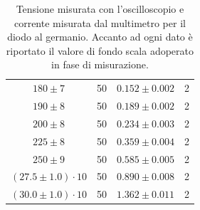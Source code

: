 \documentclass[a4paper,11pt]{article}
\begin{document}
\begin{table}[h!]
\begin{center}
\begin{tabular}{c|c|c|c}
      $180 \pm 7$               & 50                       & $0.152 \pm 0.002$      & 2                    \\
      $190 \pm 8$               & 50                       & $0.189 \pm 0.002$      & 2                    \\
      $200 \pm 8$               & 50                       & $0.234 \pm 0.003$      & 2                    \\
      $225 \pm 8$               & 50                       & $0.359 \pm 0.004$      & 2                    \\
      $250 \pm 9$               & 50                       & $0.585 \pm 0.005$      & 2                    \\
      $(27.5 \pm 1.0) \cdot 10$ & 50                       & $0.890 \pm 0.008$      & 2                    \\
      $(30.0 \pm 1.0) \cdot 10$ & 50                       & $1.362 \pm 0.011$      & 2                    \\
    \end{tabular}
    \caption{Tensione misurata con l'oscilloscopio e corrente misurata dal multimetro per il diodo al germanio. Accanto ad ogni dato è riportato il valore di fondo scala adoperato in fase di misurazione.}
  \end{center}
\end{table}
\end{document}
